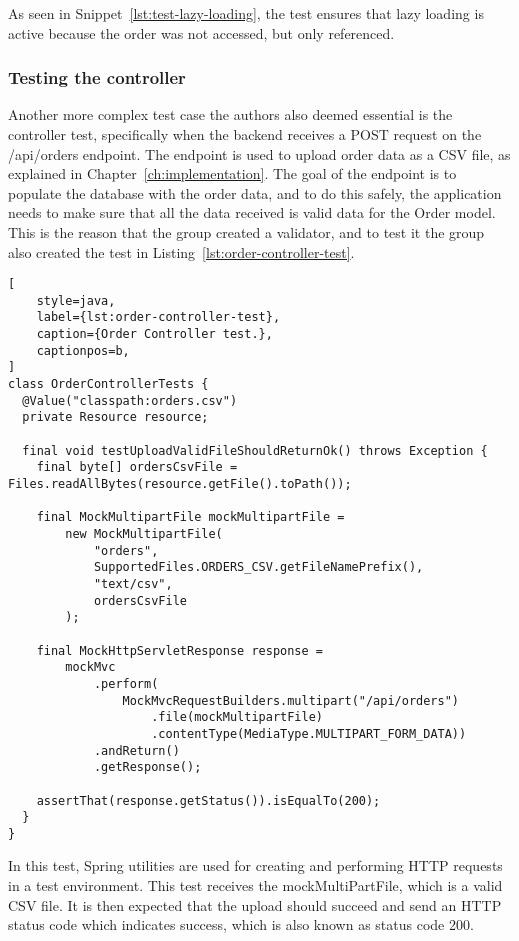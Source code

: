 As seen in Snippet~\ref{lst:test-lazy-loading}, the test ensures that lazy loading is active because the order was not
accessed, but only referenced.

\subsubsection{Testing the controller}\label{subsubsec:controller-unit-test}
Another more complex test case the authors also deemed essential is the controller test, specifically when
the backend receives a POST request on the /api/orders endpoint.
The endpoint is used to upload order data as a CSV file, as explained in
Chapter~\ref{ch:implementation}.
The goal of the endpoint is to populate the database with the order data, and to do this safely, the application needs
to make sure that all the data received is valid data for the Order model.
This is the reason that the group created a validator, and to test it the group also created the test in
Listing~\ref{lst:order-controller-test}.

\begin{lstlisting}[
    style=java,
    label={lst:order-controller-test},
    caption={Order Controller test.},
    captionpos=b,
]
class OrderControllerTests {
  @Value("classpath:orders.csv")
  private Resource resource;

  final void testUploadValidFileShouldReturnOk() throws Exception {
    final byte[] ordersCsvFile = Files.readAllBytes(resource.getFile().toPath());

    final MockMultipartFile mockMultipartFile =
        new MockMultipartFile(
            "orders",
            SupportedFiles.ORDERS_CSV.getFileNamePrefix(),
            "text/csv",
            ordersCsvFile
        );

    final MockHttpServletResponse response =
        mockMvc
            .perform(
                MockMvcRequestBuilders.multipart("/api/orders")
                    .file(mockMultipartFile)
                    .contentType(MediaType.MULTIPART_FORM_DATA))
            .andReturn()
            .getResponse();

    assertThat(response.getStatus()).isEqualTo(200);
  }
}
\end{lstlisting}

In this test, Spring utilities are used for creating and performing HTTP requests in a test environment.
This test receives the mockMultiPartFile, which is a valid CSV file.
It is then expected that the upload should succeed and send an HTTP status code which indicates success,
which is also known as status code 200.
